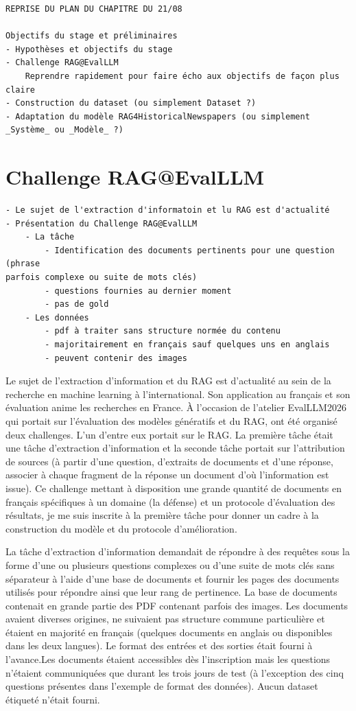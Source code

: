 \color{cyan}
\begin{verbatim}
REPRISE DU PLAN DU CHAPITRE DU 21/08

Objectifs du stage et préliminaires
- Hypothèses et objectifs du stage
- Challenge RAG@EvalLLM
    Reprendre rapidement pour faire écho aux objectifs de façon plus claire
- Construction du dataset (ou simplement Dataset ?)
- Adaptation du modèle RAG4HistoricalNewspapers (ou simplement _Système_ ou _Modèle_ ?)
\end{verbatim}
\color{black}

\section{Challenge RAG@EvalLLM}
    \begin{verbatim}
- Le sujet de l'extraction d'informatoin et lu RAG est d'actualité 
- Présentation du Challenge RAG@EvalLLM
    - La tâche
        - Identification des documents pertinents pour une question (phrase 
parfois complexe ou suite de mots clés) 
        - questions fournies au dernier moment
        - pas de gold
    - Les données
        - pdf à traiter sans structure normée du contenu
        - majoritairement en français sauf quelques uns en anglais
        - peuvent contenir des images
    \end{verbatim}

    Le sujet de l'extraction d'information et du RAG est d'actualité au sein de la recherche en machine learning à l'international. Son application au français et son évaluation anime les recherches en France. À l'occasion de l'atelier EvalLLM2026 qui portait sur l'évaluation des modèles génératifs et du RAG, ont été organisé deux challenges. L'un d'entre eux portait sur le RAG. La première tâche était une tâche d'extraction d'information et la seconde tâche portait sur l'attribution de sources (à partir d'une question, d'extraits de documents et d'une réponse, associer à chaque fragment de la réponse un document d'où l'information est issue). Ce challenge mettant à disposition une grande quantité de documents en français spécifiques à un domaine (la défense) et un protocole d'évaluation des résultats, je me suis inscrite à la première tâche pour donner un cadre à la construction du modèle et du protocole d'amélioration. 
    
    La tâche d'extraction d'information demandait de répondre à des requêtes sous la forme d'une ou plusieurs questions complexes ou d'une suite de mots clés sans séparateur à l'aide d'une base de documents et fournir les pages des documents utilisés pour répondre ainsi que leur rang de pertinence. La base de documents contenait en grande partie des PDF contenant parfois des images. Les documents avaient diverses origines, ne suivaient pas structure commune particulière et étaient en majorité en français (quelques documents en anglais ou disponibles dans les deux langues).
    Le format des entrées et des sorties était fourni à l'avance.Les documents étaient accessibles dès l'inscription mais les questions n'étaient communiquées que durant les trois jours de test (à l'exception des cinq questions présentes dans l'exemple de format des données). Aucun dataset étiqueté n'était fourni.

